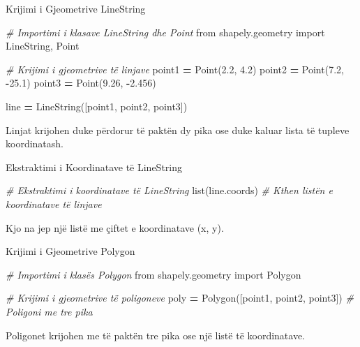 \documentclass[
  ignorenonframetext,
]{beamer}
\newenvironment{Shaded}{\begin{snugshade}}{\end{snugshade}}
\newcommand{\BuiltInTok}[1]{#1}
\newcommand{\CommentTok}[1]{\textcolor[rgb]{0.56,0.35,0.01}{\textit{#1}}}
\newcommand{\FloatTok}[1]{\textcolor[rgb]{0.00,0.00,0.81}{#1}}
\newcommand{\ImportTok}[1]{#1}
\newcommand{\NormalTok}[1]{#1}
\newcommand{\OperatorTok}[1]{\textcolor[rgb]{0.81,0.36,0.00}{\textbf{#1}}}
\begin{document}
\begin{frame}[fragile]{Krijimi i Gjeometrive LineString}
\protect\hypertarget{krijimi-i-gjeometrive-linestring}{}

\begin{Shaded}
\begin{Highlighting}[]
\CommentTok{\# Importimi i klasave LineString dhe Point}
\ImportTok{from}\NormalTok{ shapely.geometry }\ImportTok{import}\NormalTok{ LineString, Point}

\CommentTok{\# Krijimi i gjeometrive të linjave}
\NormalTok{point1 }\OperatorTok{=}\NormalTok{ Point(}\FloatTok{2.2}\NormalTok{, }\FloatTok{4.2}\NormalTok{)}
\NormalTok{point2 }\OperatorTok{=}\NormalTok{ Point(}\FloatTok{7.2}\NormalTok{, }\OperatorTok{{-}}\FloatTok{25.1}\NormalTok{)}
\NormalTok{point3 }\OperatorTok{=}\NormalTok{ Point(}\FloatTok{9.26}\NormalTok{, }\OperatorTok{{-}}\FloatTok{2.456}\NormalTok{)}

\NormalTok{line }\OperatorTok{=}\NormalTok{ LineString([point1, point2, point3])}
\end{Highlighting}
\end{Shaded}

Linjat krijohen duke përdorur të paktën dy pika ose duke kaluar lista të
tupleve koordinatash.
\end{frame}

\begin{frame}[fragile]{Ekstraktimi i Koordinatave të LineString}
\protect\hypertarget{ekstraktimi-i-koordinatave-tuxeb-linestring}{}

\begin{Shaded}
\begin{Highlighting}[]
\CommentTok{\# Ekstraktimi i koordinatave të LineString}
\BuiltInTok{list}\NormalTok{(line.coords)  }\CommentTok{\# Kthen listën e koordinatave të linjave}
\end{Highlighting}
\end{Shaded}

Kjo na jep një listë me çiftet e koordinatave (x, y).
\end{frame}

\begin{frame}[fragile]{Krijimi i Gjeometrive Polygon}
\protect\hypertarget{krijimi-i-gjeometrive-polygon}{}

\begin{Shaded}
\begin{Highlighting}[]
\CommentTok{\# Importimi i klasës Polygon}
\ImportTok{from}\NormalTok{ shapely.geometry }\ImportTok{import}\NormalTok{ Polygon}

\CommentTok{\# Krijimi i gjeometrive të poligoneve}
\NormalTok{poly }\OperatorTok{=}\NormalTok{ Polygon([point1, point2, point3])  }\CommentTok{\# Poligoni me tre pika}
\end{Highlighting}
\end{Shaded}

Poligonet krijohen me të paktën tre pika ose një listë të koordinatave.
\end{frame}
\end{document}

